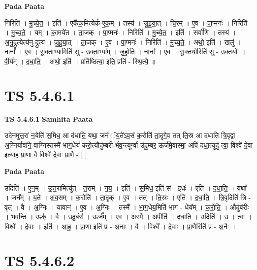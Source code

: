 \documentclass[17pt]{extarticle}
\begin{document}
\textbf{Pada Paata} \newline

निरिति॑ । मु॒च्ये॒त॒ । इति॑ । एकै॑क॒मित्येकं᳚-ए॒क॒म् । तस्य॑ । जु॒हु॒या॒त् । चि॒रम् । ए॒व । पा॒प्मनः॑ । निरिति॑ । मु॒च्य॒ते॒ । यम् । का॒मये॑त । ता॒जक् । पा॒प्मनः॑ । निरिति॑ । मु॒च्ये॒त॒ । इति॑ । सर्वा॑णि । तस्य॑ । अ॒नु॒द्रुत्येत्य॑नु-द्रुत्य॑ । जु॒हु॒या॒त् । ता॒जक् । ए॒व । पा॒प्मनः॑ । निरिति॑ । मु॒च्य॒ते॒ । अथो॒ इति॑ । खलु॑ । नाना᳚ । ए॒व । सू॒क्ताभ्या॒मिति॑ सु - उ॒क्ताभ्या᳚म् । जु॒हो॒ति॒ । नाना᳚ । ए॒व । सू॒क्तयो॒रिति॑ सु - उ॒क्तयोः᳚ । वी॒र्य᳚म् । द॒धा॒ति॒ । अथो॒ इति॑ । प्रति॑ष्ठित्या॒ इति॒ प्रति॑ - स्थि॒त्यै॒ ॥  \newline




\section*{ TS 5.4.6.1 }

\textbf{TS 5.4.6.1 } \newline
\textbf{Samhita Paata} \newline

उदे॑नमुत्त॒रां न॒येति॑ स॒मिध॒ आ द॑धाति॒ यथा॒ जनं॑ ॅय॒ते॑ऽव॒सं क॒रोति॑ ता॒दृगे॒व तत् ति॒स्र आ द॑धाति त्रि॒वृद्वा अ॒ग्निर्यावा॑ने॒-वाग्निस्तस्मै॑ भाग॒धेयं॑ करो॒त्यौदु॑म्बरी-र्भव॒न्त्यूर्ग्वा उ॑दु॒म्बर॒ ऊर्ज॑मे॒वास्मा॒ अपि॑ दधा॒त्युदु॑ त्वा॒ विश्वे॑ दे॒वा इत्या॑ह प्रा॒णा वै विश्वे॑ दे॒वाः प्रा॒णै - [  ] \newline

\textbf{Pada Paata} \newline

उदिति॑ । ए॒न॒म् । उ॒त्त॒रामित्यु॑त् - त॒राम् । न॒य॒ । इति॑ । स॒मिध॒ इति॑ सं - इधः॑ । एति॑ । द॒धा॒ति॒ । यथा᳚ । जन᳚म् । य॒ते । अ॒व॒सम् । क॒रोति॑ । ता॒दृक् । ए॒व । तत् । ति॒स्रः । एति॑ । द॒धा॒ति॒ । त्रि॒वृदिति॑ त्रि - वृत् । वै । अ॒ग्निः । यावान्॑ । ए॒व । अ॒ग्निः । तस्मै᳚ । भा॒ग॒धेय॒मिति॑ भाग - धेय᳚म् । क॒रो॒ति॒ । औदु॑बंरीः । भ॒व॒न्ति॒ । ऊर्क् । वै । उ॒दु॒बंरः॑ । ऊर्ज᳚म् । ए॒व । अ॒स्मै॒ । अपीति॑ । द॒धा॒ति॒ । उदिति॑ । उ॒ । त्वा॒ । विश्वे᳚ । दे॒वाः । इति॑ । आ॒ह॒ । प्रा॒णा इति॑ प्र - अ॒नाः । वै । विश्वे᳚ । दे॒वाः । प्रा॒णैरिति॑ प्र - अ॒नैः ।  \newline




\section*{ TS 5.4.6.2 }
\end{document}
